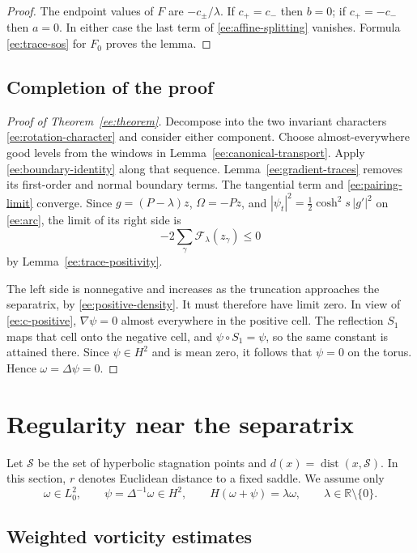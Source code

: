 \documentclass[reqno,11pt]{amsart}
\numberwithin{equation}{section}
\theoremstyle{remark}
\begin{document}
\begin{proof}
The endpoint values of $F$ are $-c_\pm/\lambda$.
If $c_+=c_-$ then $b=0$; if $c_+=-c_-$ then $a=0$.
In either case the last term of \eqref{ee:affine-splitting}
vanishes. Formula \eqref{ee:trace-sos} for $F_0$ proves the lemma.
\end{proof}

\subsection{Completion of the proof}

\begin{proof}[Proof of Theorem~\ref{ee:theorem}]
Decompose into the two invariant characters
\eqref{ee:rotation-character} and consider either component.
Choose almost-everywhere good levels from the windows in
Lemma~\ref{ee:canonical-transport}. Apply
\eqref{ee:boundary-identity} along that sequence.
Lemma~\ref{ee:gradient-traces} removes its first-order and normal
boundary terms. The tangential term and
\eqref{ee:pairing-limit} converge. Since
$g=(P-\lambda)z$, $\Omega=-Pz$, and
$|\psi_t|^2=\tfrac12\cosh^2s\,|g'|^2$ on
\eqref{ee:arc}, the limit of its right side is
\[
 -2\sum_\gamma\mathcal F_\lambda(z_\gamma)\le0
\]
by Lemma~\ref{ee:trace-positivity}.

The left side is nonnegative and increases as the truncation
approaches the separatrix, by \eqref{ee:positive-density}.
It must therefore have limit zero. In view of
\eqref{ee:c-positive}, $\nabla\psi=0$ almost everywhere in the
positive cell. The reflection $S_1$ maps that cell onto the
negative cell, and $\psi\circ S_1=\psi$, so the same constant is
attained there. Since $\psi\in H^2$ and is mean zero, it follows
that $\psi=0$ on the torus. Hence $\omega=\Delta\psi=0$.
\end{proof}

\section{Regularity near the separatrix}
\label{sec:saddle-gains}

Let $\mathcal S$ be the set of hyperbolic stagnation points and
$d(x)=\operatorname{dist}(x,\mathcal S)$. In this section, $r$
denotes Euclidean distance to a fixed saddle. We assume only
\[
 \omega\in L^2_0,\qquad \psi=\Delta^{-1}\omega\in H^2,
 \qquad H(\omega+\psi)=\lambda\omega,\qquad
 \lambda\in\mathbb R\setminus\{0\}.
\]

\subsection{Weighted vorticity estimates}
\end{document}
